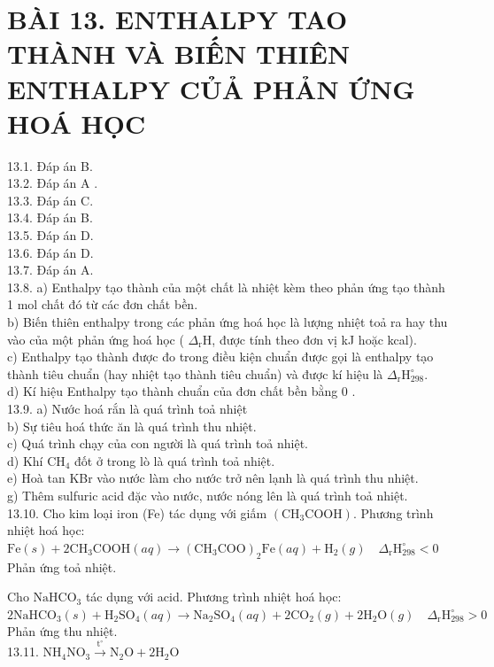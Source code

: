 \documentclass[10pt]{article}
\begin{document}
\section*{BÀI 13. ENTHALPY TAO THÀNH VÀ BIẾN THIÊN ENTHALPY CỦẢ PHẢN ỨNG HOÁ HỌC}
13.1. Đáp án B.\\
13.2. Đáp án A .\\
13.3. Đáp án C.\\
13.4. Đáp án B.\\
13.5. Đáp án D.\\
13.6. Đáp án D.\\
13.7. Đáp án A.\\
13.8. a) Enthalpy tạo thành của một chất là nhiệt kèm theo phản ứng tạo thành 1 mol chất đó từ các đơn chất bền.\\
b) Biến thiên enthalpy trong các phản ứng hoá học là lượng nhiệt toả ra hay thu vào của một phản ứng hoá học ( $\Delta_{\mathrm{r}} \mathrm{H}$, được tính theo đơn vị kJ hoặc kcal).\\
c) Enthalpy tạo thành được đo trong điều kiện chuẩn được gọi là enthalpy tạo thành tiêu chuẩn (hay nhiệt tạo thành tiêu chuẩn) và được kí hiệu là $\Delta_{\mathrm{r}} \mathrm{H}_{298}^{\circ}$.\\
d) Kí hiệu Enthalpy tạo thành chuẩn của đơn chất bền bằng 0 .\\
13.9. a) Nước hoá rắn là quá trình toả nhiệt\\
b) Sự tiêu hoá thức ăn là quá trình thu nhiệt.\\
c) Quá trình chạy của con người là quá trình toả nhiệt.\\
d) Khí $\mathrm{CH}_{4}$ đốt ở trong lò là quá trình toả nhiệt.\\
e) Hoà tan KBr vào nước làm cho nước trở nên lạnh là quá trình thu nhiệt.\\
g) Thêm sulfuric acid đặc vào nước, nước nóng lên là quá trình toả nhiệt.\\
13.10. Cho kim loại iron (Fe) tác dụng với giấm $\left(\mathrm{CH}_{3} \mathrm{COOH}\right)$. Phương trình nhiệt hoá học:\\
$\mathrm{Fe}(s)+2 \mathrm{CH}_{3} \mathrm{COOH}(a q) \rightarrow\left(\mathrm{CH}_{3} \mathrm{COO}\right)_{2} \mathrm{Fe}(a q)+\mathrm{H}_{2}(g) \quad \Delta_{\mathrm{r}} \mathrm{H}_{298}^{\circ}<0$\\
Phản ứng toả nhiệt.

Cho $\mathrm{NaHCO}_{3}$ tác dụng với acid. Phương trình nhiệt hoá học:\\
$2 \mathrm{NaHCO}_{3}(s)+\mathrm{H}_{2} \mathrm{SO}_{4}(a q) \rightarrow \mathrm{Na}_{2} \mathrm{SO}_{4}(a q)+2 \mathrm{CO}_{2}(g)+2 \mathrm{H}_{2} \mathrm{O}(g) \quad \Delta_{\mathrm{r}} \mathrm{H}_{298}^{\circ}>0$\\
Phản ứng thu nhiệt.\\
13.11. $\mathrm{NH}_{4} \mathrm{NO}_{3} \xrightarrow{\mathrm{t}^{\circ}} \mathrm{N}_{2} \mathrm{O}+2 \mathrm{H}_{2} \mathrm{O}$
\end{document}
